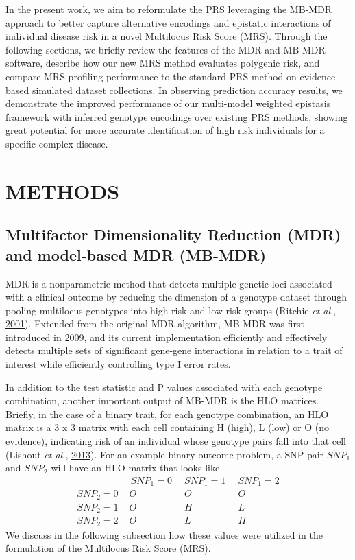 \documentclass[a4paper,twoside, 9pt]{article}
\begin{document}
In the present work, we aim to reformulate the PRS leveraging the MB-MDR
approach to better capture alternative encodings and epistatic
interactions of individual disease risk in a novel Multilocus Risk Score
(MRS). Through the following sections, we briefly review the features of
the MDR and MB-MDR software, describe how our new MRS method evaluates
polygenic risk, and compare MRS profiling performance to the standard
PRS method on evidence-based simulated dataset collections. In observing
prediction accuracy results, we demonstrate the improved performance of
our multi-model weighted epistasis framework with inferred genotype
encodings over existing PRS methods, showing great potential for more
accurate identification of high risk individuals for a specific complex
disease.

\section{\uppercase{Methods}}

\noindent \subsection{Multifactor Dimensionality Reduction (MDR) and
model-based MDR
(MB-MDR)}\label{multifactor-dimensionality-reduction-mdr-and-model-based-mdr-mb-mdr}
MDR is a nonparametric method that detects multiple genetic loci
associated with a clinical outcome by reducing the dimension of a
genotype dataset through pooling multilocus genotypes into high-risk and
low-risk groups (Ritchie \emph{et al.},
\protect\hyperlink{ref-E26QhGxD}{2001}). Extended from the original MDR
algorithm, MB-MDR was first introduced in 2009, and its current
implementation efficiently and effectively detects multiple sets of
significant gene-gene interactions in relation to a trait of interest
while efficiently controlling type I error rates.

In addition to the test statistic and P values associated with each
genotype combination, another important output of MB-MDR is the HLO
matrices. Briefly, in the case of a binary trait, for each genotype
combination, an HLO matrix is a 3 x 3 matrix with each cell containing H
(high), L (low) or O (no evidence), indicating risk of an individual
whose genotype pairs fall into that cell (Lishout \emph{et al.},
\protect\hyperlink{ref-S6nj6BFK}{2013}). For an example binary outcome
problem, a SNP pair \(SNP_1\) and \(SNP_2\) will have an HLO
matrix that looks like \[ \begin{array}{l|ccc}
& \, SNP_1 = 0 \,\,\,& SNP_1 = 1 \,\,\,& SNP_1 = 2   \\
\hline
SNP_2 = 0 \,\,& O        & O        & O \\
SNP_2 = 1 \,\,& O        & H        & L \\
SNP_2 = 2 \,\,& O        & L        & H
\end{array}
\] We discuss in the following subsection how these values were utilized
in the formulation of the Multilocus Risk Score (MRS).
\end{document}

